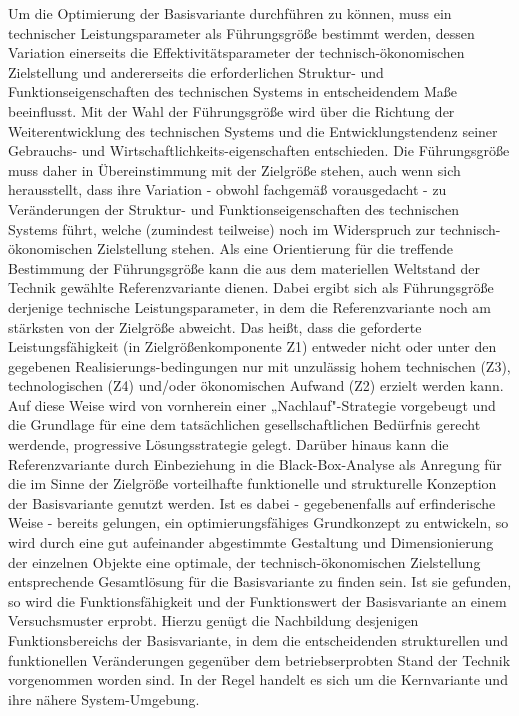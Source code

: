 \documentclass[12pt,a4paper]{article}
\begin{document}
Um die Optimierung der Basisvariante durchführen zu können, muss ein technischer Leistungsparameter als Führungsgröße bestimmt werden, dessen Variation einerseits die Effektivitätsparameter der technisch-ökonomischen Zielstellung und andererseits die erforder­lichen Struktur- und Funktionseigenschaften des technischen Systems in entscheidendem Maße beeinflusst. Mit der Wahl der Führungsgröße wird über die Richtung der Weiterentwicklung des technischen Systems und die Entwicklungstendenz seiner Gebrauchs- und Wirtschaftlichkeits-eigenschaften entschieden. Die Führungsgröße muss daher in Übereinstimmung mit der Zielgröße stehen, auch wenn sich herausstellt, dass ihre Variation - obwohl fachgemäß voraus­gedacht - zu Veränderungen der Struktur- und Funktionseigenschaften des technischen Systems führt, welche (zumindest teilweise) noch im Widerspruch zur technisch-ökonomischen Zielstellung stehen. Als eine Orientierung für die treffende Bestimmung der Führungsgröße kann die aus dem materiellen Weltstand der Technik gewählte Referenzvariante dienen. Dabei ergibt sich als Führungs­größe derjenige technische Leistungsparameter, in dem die Refe­renzvariante noch am stärksten von der Zielgröße abweicht. Das heißt, dass die geforderte Leistungsfähigkeit (in Zielgrößenkomponente Z1) entweder nicht oder unter den gegebenen Realisierungs-bedingungen nur mit unzulässig hohem technischen (Z3), technologischen (Z4) und/oder ökonomischen Aufwand (Z2) erzielt werden kann. Auf diese Weise wird von vornherein einer „Nachlauf"-Strategie vorgebeugt und die Grundlage für eine dem tatsächlichen ge­sellschaftlichen Bedürfnis gerecht werdende, progressive Lösungsstrategie gelegt. Darüber hinaus kann die Referenzvariante durch Einbeziehung in die Black-Box-Analyse als Anregung für die im Sinne der Zielgröße vorteilhafte funktionelle und strukturelle Konzeption der Basisvariante genutzt werden. Ist es dabei - gegebenenfalls auf erfinderische Weise - bereits gelungen, ein optimierungsfähiges Grundkonzept zu entwickeln, so wird durch eine gut aufeinander abgestimmte Gestaltung und Dimensionierung der einzelnen Objekte eine optimale, der technisch-ökonomischen Zielstellung entsprechende Gesamtlösung für die Basisvariante zu fin­den sein. Ist sie gefunden, so wird die Funktionsfähigkeit und der Funktionswert der Basisvariante an einem Versuchsmuster erprobt. Hierzu genügt die Nachbildung desjenigen Funktionsbereichs der Basisvariante, in dem die entscheidenden strukturellen und funktionellen Veränderungen gegenüber dem betriebserprobten Stand der Technik vorgenommen worden sind. In der Regel handelt es sich um die Kernvariante und ihre nähere System-Umgebung.
\end{document}
